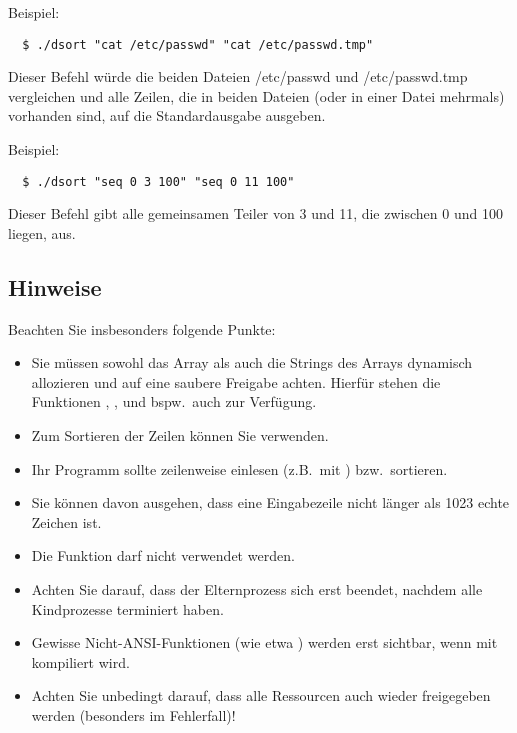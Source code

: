 Beispiel:
\begin{verbatim}
  $ ./dsort "cat /etc/passwd" "cat /etc/passwd.tmp"
\end{verbatim}

Dieser Befehl würde die beiden Dateien /etc/passwd und /etc/passwd.tmp
vergleichen und alle Zeilen, die in beiden Dateien (oder in einer Datei
mehrmals) vorhanden sind, auf die Standardausgabe ausgeben.

Beispiel:
\begin{verbatim}
  $ ./dsort "seq 0 3 100" "seq 0 11 100"
\end{verbatim}

Dieser Befehl gibt alle gemeinsamen Teiler von 3 und 11, die zwischen
0 und 100 liegen, aus.

\subsection*{Hinweise}

Beachten Sie insbesonders folgende Punkte:

\begin{itemize}
\item Sie müssen sowohl das Array als auch die Strings des Arrays
dynamisch allozieren und auf eine saubere Freigabe achten. Hierfür
stehen die Funktionen , ,
 und bspw.\ auch  zur Verfügung.
\item Zum Sortieren der Zeilen können Sie  verwenden.
\item Ihr Programm sollte zeilenweise einlesen (z.B.\ mit
) bzw.\ sortieren.
\item Sie können davon ausgehen, dass eine Eingabezeile nicht länger
als 1023 echte Zeichen ist.
\item Die Funktion  darf nicht verwendet werden.
\item Achten Sie darauf, dass der Elternprozess sich erst beendet,
nachdem alle Kindprozesse terminiert haben.
\item Gewisse Nicht-ANSI-Funktionen (wie etwa ) werden
erst sichtbar, wenn mit\\ kompiliert wird.
\item Achten Sie unbedingt darauf, dass alle Ressourcen auch wieder
freigegeben werden (besonders im Fehlerfall)!
\end{itemize}

\osueguidelinestwo


